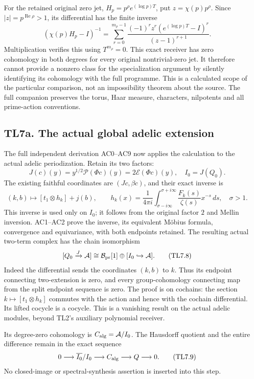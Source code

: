 For the retained original zero jet, \(H_p=p^\rho e^{(\log p)T}\), put
\(z=\chi(p)p^\rho\). Since \(|z|=p^{\operatorname{Re}\rho}>1\), its
differential has the finite inverse \[
(\chi(p)H_p-I)^{-1}
=\sum_{r=0}^{m_\rho-1}
\frac{(-1)^rz^r(e^{(\log p)T}-I)^r}{(z-1)^{r+1}}.
\tag{TL7.5}
\] Multiplication verifies this using \(T^{m_\rho}=0\). This exact
receiver has zero cohomology in both degrees for every original
nontrivial-zero jet. It therefore cannot provide a nonzero class for the
specialization argument by silently identifying its cohomology with the
full programme. This is a calculated scope of the particular comparison,
not an impossibility theorem about the source. The full companion
preserves the torus, Haar measure, characters, nilpotents and all
prime-action conventions.

\subsection{TL7a. The actual global adelic
extension}\label{tl7a.-the-actual-global-adelic-extension}

The full independent derivation AC0--AC9 now applies the calculation to
the actual adelic periodization. Retain its two factors: \[
J(c)(y)=y^{1/2}\mathcal P(\Phi c)(y)=2\mathcal E(\Phi c)(y),
\quad I_0=J(Q_0).
\tag{TL7.6}
\] The existing faithful coordinates are \((Jc,\beta c)\), and their
exact inverse is \[
(k,b)\longmapsto[t_1\otimes h_k]+j(b),\qquad
h_k(x)=\frac1{4\pi i}\int_{\sigma-i\infty}^{\sigma+i\infty}
\frac{F_k(s)}{\zeta(s)}x^{-s}\,ds,\quad\sigma>1.
\tag{TL7.7}
\] This inverse is used only on \(I_0\); it follows from the original
factor \(2\) and Mellin inversion. AC1--AC2 prove the inverse, its
equivalent Möbius formula, convergence and equivariance, with both
endpoints retained. The resulting actual two-term complex has the chain
isomorphism \[
[Q_0\xrightarrow J\mathcal A]
\cong\mathcal B_{\rm pr}[1]\oplus[I_0\hookrightarrow\mathcal A].
\tag{TL7.8}
\] Indeed the differential sends the coordinates \((k,b)\) to \(k\).
Thus its endpoint connecting two-extension is zero, and every
group-cohomology connecting map from the split endpoint sequence is
zero. The proof is on cochains: the section \(k\mapsto[t_1\otimes h_k]\)
commutes with the action and hence with the cochain differential. Its
lifted cocycle is a cocycle. This is a vanishing result on the actual
adelic modules, beyond TL2's auxiliary polynomial receiver.

Its degree-zero cohomology is \(C_{\rm alg}=\mathcal A/I_0\). The
Hausdorff quotient and the entire difference remain in the exact
sequence \[
0\longrightarrow\overline{I_0}/I_0\longrightarrow C_{\rm alg}
\longrightarrow Q\longrightarrow0.
\tag{TL7.9}
\] No closed-image or spectral-synthesis assertion is inserted into this
step.

